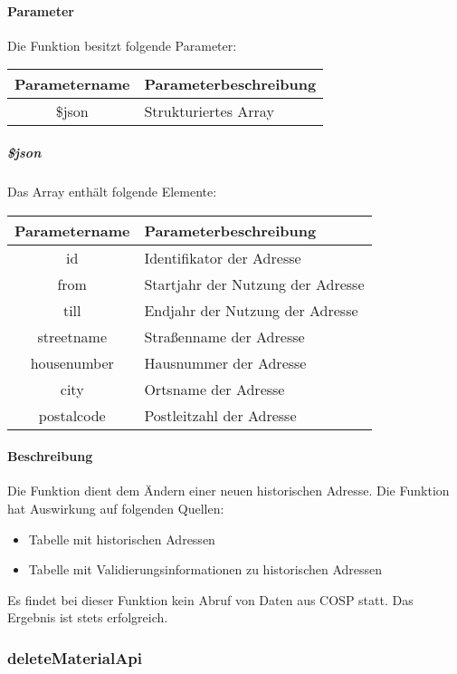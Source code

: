 \paragraph{Parameter} Die Funktion besitzt folgende Parameter:
\begin{table}[H]
	\begin{tabular}{|c|p{11cm}|}
		\hline
		\textbf{Parametername} & \textbf{Parameterbeschreibung} \\ \hline
		\$json & Strukturiertes Array \\ \hline
	\end{tabular}
\end{table}
\subparagraph{\$json}Das Array enthält folgende Elemente:
\begin{table}[H]
	\begin{tabular}{|c|p{11cm}|}
		\hline
		\textbf{Parametername} & \textbf{Parameterbeschreibung} \\ \hline
		id & Identifikator der Adresse \\ \hline
		from & Startjahr der Nutzung der Adresse \\ \hline
		till & Endjahr der Nutzung der Adresse \\ \hline
		streetname & Straßenname der Adresse \\ \hline
		housenumber & Hausnummer der Adresse \\ \hline
		city & Ortsname der Adresse \\ \hline
		postalcode & Postleitzahl der Adresse \\ \hline
	\end{tabular}
\end{table}
\paragraph{Beschreibung} Die Funktion dient dem Ändern einer neuen historischen Adresse. Die Funktion hat Auswirkung auf folgenden Quellen:
\begin{itemize}
	\item Tabelle mit historischen Adressen
	\item Tabelle mit Validierungsinformationen zu historischen Adressen
\end{itemize}
Es findet bei dieser Funktion kein Abruf von Daten aus {\glqq COSP\grqq} statt. Das Ergebnis ist stets erfolgreich.
\subsubsection{deleteMaterialApi}
